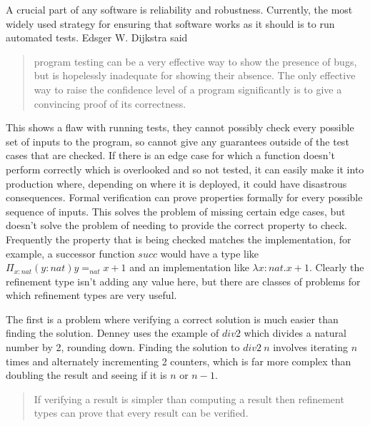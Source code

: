 A crucial part of any software is reliability and robustness.
Currently, the most widely used strategy for ensuring that software works as it should
is to run automated tests.
Edsger W. Dijkstra said \cite{dijkstra72}
\begin{quote}
    program testing can be a very effective way to show the presence of bugs, but is
    hopelessly inadequate for showing their absence.
    The only effective way to raise the confidence level of a program significantly is
    to give a convincing proof of its correctness.
\end{quote}
This shows a flaw with running tests, they cannot possibly check every possible set of inputs
to the program, so cannot give any guarantees outside of the test cases that are checked.
If there is an edge case for which a function doesn't perform correctly which is overlooked
and so not tested, it can easily make it into production where, depending on where it is
deployed, it could have disastrous consequences.
Formal verification can prove properties formally for every possible sequence of inputs.
This solves the problem of missing certain edge cases, but doesn't solve the problem of
needing to provide the correct property to check.
Frequently the property that is being checked matches the implementation, for example,
a successor function $succ$ would have a type like $\Pi_{x:nat} (y:nat) y =_{nat} x+1$
and an implementation like $\lambda x:nat . x+1$.
Clearly the refinement type isn't adding any value here,
but there are classes of problems for which refinement types are very useful.

The first is a problem where verifying a correct solution is much easier than finding
the solution.
Denney uses the example of $div2$ which divides a natural number by 2, rounding down.
Finding the solution to $div2\ n$ involves iterating $n$ times and alternately incrementing
2 counters, which is far more complex than doubling the result and seeing if it is $n$ or
$n-1$.
\begin{quote}
    If verifying a result is simpler than computing a result then refinement types can prove that
    every result can be verified.
\end{quote}

